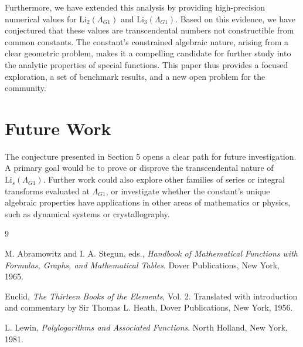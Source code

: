 \documentclass{amsart}
\theoremstyle{plain}
\theoremstyle{definition}
\theoremstyle{remark}
\newcommand{\LambdaG}{\Lambda_{G1}}
\begin{document}
Furthermore, we have extended this analysis by providing high-precision numerical values for $\mathrm{Li}_2(\LambdaG)$ and $\mathrm{Li}_3(\LambdaG)$. Based on this evidence, we have conjectured that these values are transcendental numbers not constructible from common constants. The constant's constrained algebraic nature, arising from a clear geometric problem, makes it a compelling candidate for further study into the analytic properties of special functions. This paper thus provides a focused exploration, a set of benchmark results, and a new open problem for the community.

\section{Future Work}
The conjecture presented in Section 5 opens a clear path for future investigation. A primary goal would be to prove or disprove the transcendental nature of $\mathrm{Li}_s(\LambdaG)$. Further work could also explore other families of series or integral transforms evaluated at $\LambdaG$, or investigate whether the constant's unique algebraic properties have applications in other areas of mathematics or physics, such as dynamical systems or crystallography.

\begin{thebibliography}{9}

M. Abramowitz and I. A. Stegun, eds.,
\textit{Handbook of Mathematical Functions with Formulas, Graphs, and Mathematical Tables}.
Dover Publications, New York, 1965.

Euclid,
\textit{The Thirteen Books of the Elements}, Vol. 2.
Translated with introduction and commentary by Sir Thomas L. Heath, Dover Publications, New York, 1956.

L. Lewin,
\textit{Polylogarithms and Associated Functions}.
North Holland, New York, 1981.

\end{thebibliography}
\end{document}
